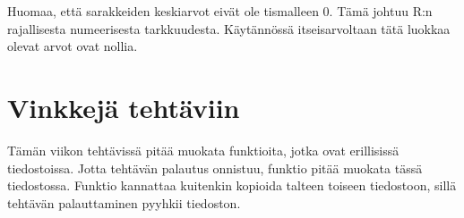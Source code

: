 \documentclass[
]{book}
\begin{document}
Huomaa, että sarakkeiden keskiarvot eivät ole tismalleen 0. Tämä johtuu R:n rajallisesta numeerisesta tarkkuudesta. Käytännössä itseisarvoltaan tätä luokkaa olevat arvot ovat nollia.

\hypertarget{vinkkejuxe4-tehtuxe4viin}{%
\section{Vinkkejä tehtäviin}\label{vinkkejuxe4-tehtuxe4viin}}

Tämän viikon tehtävissä pitää muokata funktioita, jotka ovat erillisissä tiedostoissa. Jotta tehtävän palautus onnistuu, funktio pitää muokata tässä tiedostossa. Funktio kannattaa kuitenkin kopioida talteen toiseen tiedostoon, sillä tehtävän palauttaminen pyyhkii tiedoston.
\end{document}
